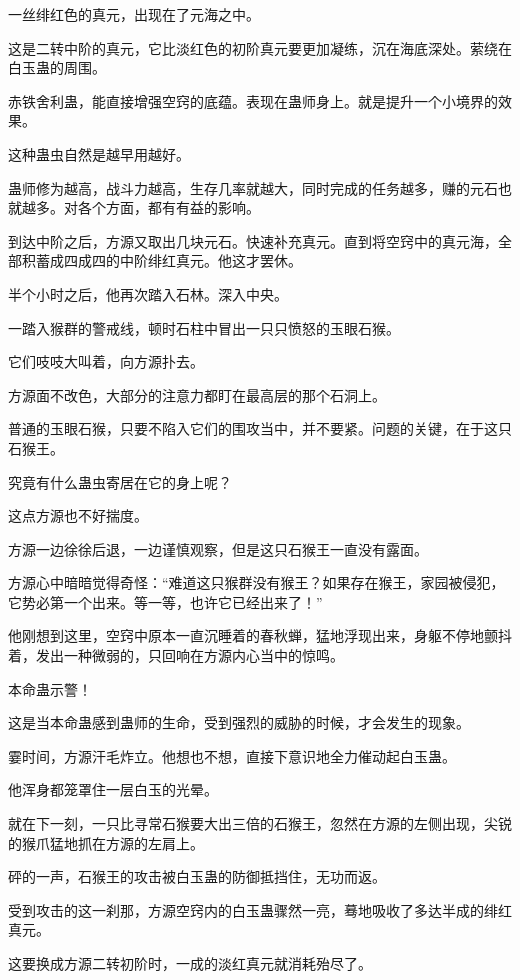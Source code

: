 \begin{this_body}
一丝绯红色的真元，出现在了元海之中。

这是二转中阶的真元，它比淡红色的初阶真元要更加凝练，沉在海底深处。萦绕在白玉蛊的周围。

赤铁舍利蛊，能直接增强空窍的底蕴。表现在蛊师身上。就是提升一个小境界的效果。

这种蛊虫自然是越早用越好。

蛊师修为越高，战斗力越高，生存几率就越大，同时完成的任务越多，赚的元石也就越多。对各个方面，都有有益的影响。

到达中阶之后，方源又取出几块元石。快速补充真元。直到将空窍中的真元海，全部积蓄成四成四的中阶绯红真元。他这才罢休。

半个小时之后，他再次踏入石林。深入中央。

一踏入猴群的警戒线，顿时石柱中冒出一只只愤怒的玉眼石猴。

它们吱吱大叫着，向方源扑去。

方源面不改色，大部分的注意力都盯在最高层的那个石洞上。

普通的玉眼石猴，只要不陷入它们的围攻当中，并不要紧。问题的关键，在于这只石猴王。

究竟有什么蛊虫寄居在它的身上呢？

这点方源也不好揣度。

方源一边徐徐后退，一边谨慎观察，但是这只石猴王一直没有露面。

方源心中暗暗觉得奇怪：“难道这只猴群没有猴王？如果存在猴王，家园被侵犯，它势必第一个出来。等一等，也许它已经出来了！”

他刚想到这里，空窍中原本一直沉睡着的春秋蝉，猛地浮现出来，身躯不停地颤抖着，发出一种微弱的，只回响在方源内心当中的惊鸣。

本命蛊示警！

这是当本命蛊感到蛊师的生命，受到强烈的威胁的时候，才会发生的现象。

霎时间，方源汗毛炸立。他想也不想，直接下意识地全力催动起白玉蛊。

他浑身都笼罩住一层白玉的光晕。

就在下一刻，一只比寻常石猴要大出三倍的石猴王，忽然在方源的左侧出现，尖锐的猴爪猛地抓在方源的左肩上。

砰的一声，石猴王的攻击被白玉蛊的防御抵挡住，无功而返。

受到攻击的这一刹那，方源空窍内的白玉蛊骤然一亮，蓦地吸收了多达半成的绯红真元。

这要换成方源二转初阶时，一成的淡红真元就消耗殆尽了。


\end{this_body}
